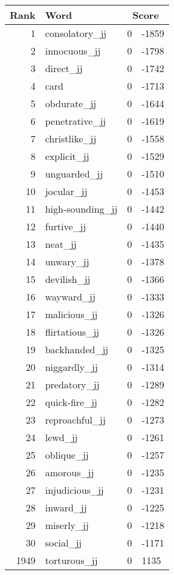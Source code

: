 \begin{longtable}[!htbp]{| rlr@{.}l |}
    \hline
    \textbf{Rank} & \textbf{Word} & \multicolumn{2}{c|}{\textbf{Score}} \\
    \hline
    \endhead
    1 & consolatory\_jj & 0 & -1859 \\
    2 & innocuous\_jj & 0 & -1798 \\
    3 & direct\_jj & 0 & -1742 \\
    4 & card & 0 & -1713 \\
    5 & obdurate\_jj & 0 & -1644 \\
    6 & penetrative\_jj & 0 & -1619 \\
    7 & christlike\_jj & 0 & -1558 \\
    8 & explicit\_jj & 0 & -1529 \\
    9 & unguarded\_jj & 0 & -1510 \\
    10 & jocular\_jj & 0 & -1453 \\
    11 & high-sounding\_jj & 0 & -1442 \\
    12 & furtive\_jj & 0 & -1440 \\
    13 & neat\_jj & 0 & -1435 \\
    14 & unwary\_jj & 0 & -1378 \\
    15 & devilish\_jj & 0 & -1366 \\
    16 & wayward\_jj & 0 & -1333 \\
    17 & malicious\_jj & 0 & -1326 \\
    18 & flirtatious\_jj & 0 & -1326 \\
    19 & backhanded\_jj & 0 & -1325 \\
    20 & niggardly\_jj & 0 & -1314 \\
    21 & predatory\_jj & 0 & -1289 \\
    22 & quick-fire\_jj & 0 & -1282 \\
    23 & reproachful\_jj & 0 & -1273 \\
    24 & lewd\_jj & 0 & -1261 \\
    25 & oblique\_jj & 0 & -1257 \\
    26 & amorous\_jj & 0 & -1235 \\
    27 & injudicious\_jj & 0 & -1231 \\
    28 & inward\_jj & 0 & -1225 \\
    29 & miserly\_jj & 0 & -1218 \\
    30 & social\_jj & 0 & -1171 \\
    1949 & torturous\_jj & 0 & 1135 \\

\end{longtable}
